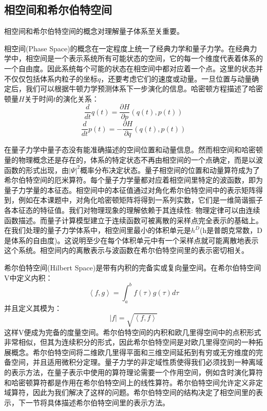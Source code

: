 
\subsection{相空间和希尔伯特空间}
相空间和希尔伯特空间的概念对理解量子体系至关重要。

相空间(Phase Space)的概念在一定程度上统一了经典力学和量子力学\cite{phase_space}。在经典力学中，相空间是一个表示系统所有可能状态的空间，它的每一个维度代表着体系的一个自由度。因此系统每个可能的状态在相空间中都对应着一个点。这里的状态并不仅仅包括体系内粒子的坐标$q$，还要考虑它们的速度或动量。一旦位置与动量确定后，我们可以根据牛顿力学预测体系下一步演化的信息。哈密顿方程描述了哈密顿量$H$关于时间$t$的演化关系：
\begin{equation*}
  \frac{d}{dt}q(t) = \frac{\partial H}{\partial p}(q(t),p(t))
\end{equation*}
\begin{equation*}
  \frac{d}{dt}p(t) = -\frac{\partial H}{\partial q}(q(t),p(t))
\end{equation*}

在量子力学中量子态没有能准确描述的空间位置和动量信息。然而相空间和哈密顿量的物理概念还是存在的，体系的特定状态不再由相空间的一个点确定，而是以波函数的形式出现，由${\left|\Psi\right|}^2$概率分布决定状态。量子相空间的位置和动量算符成为了希尔伯特空间的厄米算符。每个量子力学量都对应着相空间里特定的波函数，即为量子力学量的本征态\cite{math_quantum}。相空间中的本征值通过对角化希尔伯特空间中的表示矩阵得到，例如在本课题中，对角化哈密顿矩阵将得到一系列实数，它们是一维简谐振子各本征态的特征值。我们对物理现象的理解依赖于其连续性: 物理定律可以由连续函数描述。而量子计算模型建立于连续函数可被离散的采样点完全表示的基础上。在我们处理的量子力学体系中，相空间里最小的体积单元是$ h^{D} $(h是普朗克常数，D是体系的自由度)。这说明至少在每个体积单元中有一个采样点就可能离散地表示这个系统。相空间内的离散表示与波函数在希尔伯特空间里的表示密切相关。

希尔伯特空间(Hilbert Space)是带有内积的完备实或复向量空间\cite{Hilbert_space}。在希尔伯特空间V中定义内积：
\begin{equation}
  \left< f,g \right> = \int_a^b f(\tau)g(\tau)d{\tau}
\end{equation}
并且定义其模为：
\begin{equation*}
  \left| f \right| = \sqrt{\left< f,f \right>}
\end{equation*}
这样V便成为完备的度量空间。希尔伯特空间的内积和欧几里得空间中的点积形式非常相似，但其为连续积分的形式，因此希尔伯特空间是对欧几里得空间的一种拓展概念。希尔伯特空间将二维欧几里得平面和三维空间延拓到有穷或无穷维度的完备空间，并且适用微积分定理。量子力学的非定域性质使得我们必须找到一种离域的表示方法，在量子表示中使用的算符理论需要一个作用空间，例如含时演化算符和哈密顿算符都是作用在希尔伯特空间上的线性算符。希尔伯特空间允许定义非定域算符，因此为我们解决了这样的问题。希尔伯特空间的结构决定了相空间里的表示，下一节将具体描述希尔伯特空间里的表示方法。


